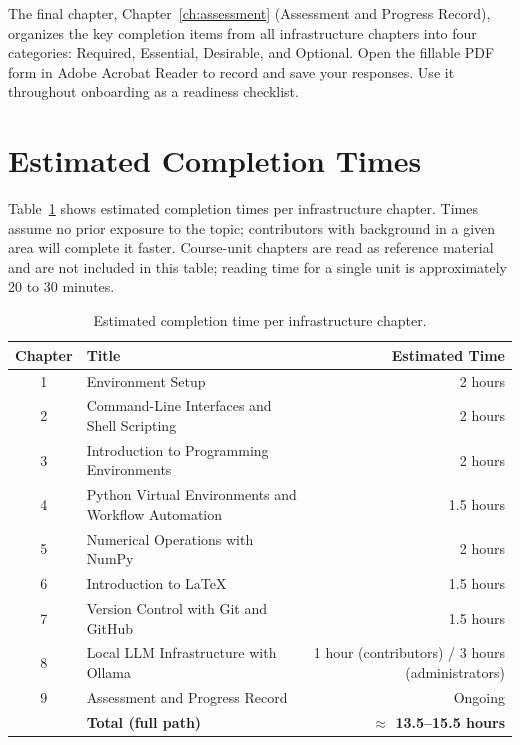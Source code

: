 \begin{landscape}
The final chapter, Chapter~\ref{ch:assessment} (Assessment and Progress
Record), organizes the key completion items from all infrastructure chapters
into four categories: Required, Essential, Desirable, and Optional. Open
the fillable PDF form in Adobe Acrobat Reader to record and save your
responses. Use it throughout onboarding as a readiness checklist.

\newpage
\section*{Estimated Completion Times}

Table~\ref{tab:times} shows estimated completion times per infrastructure
chapter. Times assume no prior exposure to the topic; contributors with
background in a given area will complete it faster. Course-unit chapters
are read as reference material and are not included in this table; reading
time for a single unit is approximately 20 to 30 minutes.

\begin{table}[htbp]
\centering
\caption{Estimated completion time per infrastructure chapter.}
\label{tab:times}
\begin{tabular}{clr}
\toprule
\textbf{Chapter} & \textbf{Title} & \textbf{Estimated Time} \\
\midrule
1  & Environment Setup                              & 2 hours \\
2  & Command-Line Interfaces and Shell Scripting    & 2 hours \\
3  & Introduction to Programming Environments       & 2 hours \\
4  & Python Virtual Environments and Workflow Automation & 1.5 hours \\
5  & Numerical Operations with NumPy                & 2 hours \\
6  & Introduction to \LaTeX{}                       & 1.5 hours \\
7  & Version Control with Git and GitHub            & 1.5 hours \\
8  & Local LLM Infrastructure with Ollama           & 1 hour (contributors) / 3 hours (administrators) \\
9  & Assessment and Progress Record                 & Ongoing \\
\midrule
   & \textbf{Total (full path)}                     & \textbf{$\approx$ 13.5--15.5 hours} \\
\bottomrule
\end{tabular}
\end{table}

\end{landscape}